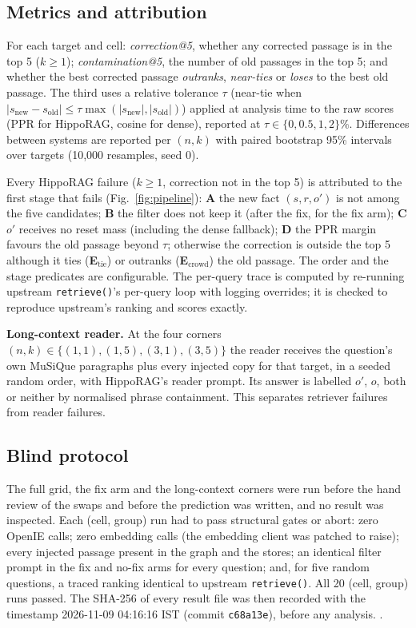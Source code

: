 \subsection{Metrics and attribution}\label{sec:metrics}
For each target and cell: \emph{correction@5}, whether any corrected passage is in the top 5 ($k \ge 1$);
\emph{contamination@5}, the number of old passages in the top 5; and whether the best corrected passage
\emph{outranks}, \emph{near-ties} or \emph{loses} to the best old passage. The third uses a relative tolerance $\tau$
(near-tie when $|s_\text{new} - s_\text{old}| \le \tau \max(|s_\text{new}|, |s_\text{old}|)$) applied at analysis time
to the raw scores (PPR for HippoRAG, cosine for dense), reported at $\tau \in \{0, 0.5, 1, 2\}\%$. Differences between
systems are reported per $(n, k)$ with paired bootstrap 95\% intervals over targets (10,000 resamples, seed 0).

Every HippoRAG failure ($k \ge 1$, correction not in the top 5) is attributed to the first stage that fails
(Fig.~\ref{fig:pipeline}): \textbf{A} the new fact $(s, r, o')$ is not among the five candidates; \textbf{B} the filter
does not keep it (after the fix, for the fix arm); \textbf{C} $o'$ receives no reset mass (including the dense
fallback); \textbf{D} the PPR margin favours the old passage beyond $\tau$; otherwise the correction is outside the top 5
although it ties (\textbf{E}$_\text{tie}$) or outranks (\textbf{E}$_\text{crowd}$) the old passage. The order and the
stage predicates are configurable. The per-query trace is computed by re-running upstream \texttt{retrieve()}'s
per-query loop with logging overrides; it is checked to reproduce upstream's ranking and scores exactly.

\textbf{Long-context reader.} At the four corners $(n, k) \in \{(1,1), (1,5), (3,1), (3,5)\}$ the reader receives the
question's own MuSiQue paragraphs plus every injected copy for that target, in a seeded random order, with HippoRAG's
reader prompt. Its answer is labelled $o'$, $o$, both or neither by normalised phrase containment. This separates
retriever failures from reader failures.

\subsection{Blind protocol}\label{sec:blind}
The full grid, the fix arm and the long-context corners were run before the hand review of the swaps and before the
prediction was written, and no result was inspected. Each (cell, group) run had to pass structural gates or abort:
zero OpenIE calls; zero embedding calls (the embedding client was patched to raise); every injected passage present in
the graph and the stores; an identical filter prompt in the fix and no-fix arms for every question; and, for five
random questions, a traced ranking identical to upstream \texttt{retrieve()}. All 20 (cell, group) runs passed. The
SHA-256 of every result file was then recorded with the timestamp 2026-11-09 04:16:16 IST (commit \texttt{c68a13e}),
before any analysis. .

